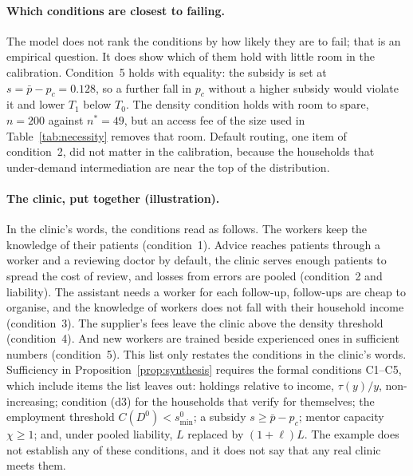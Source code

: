 \documentclass[12pt]{article}
\theoremstyle{remark}
\begin{document}
\paragraph{Which conditions are closest to failing.} The model does not rank the conditions by how likely they are to fail; that is an empirical question. It does show which of them hold with little room in the calibration. Condition~5 holds with equality: the subsidy is set at $s=\bar p-p_c=0.128$, so a further fall in $p_c$ without a higher subsidy would violate it and lower $T_1$ below $T_0$. The density condition holds with room to spare, $n=200$ against $n^*=49$, but an access fee of the size used in Table~\ref{tab:necessity} removes that room. Default routing, one item of condition~2, did not matter in the calibration, because the households that under-demand intermediation are near the top of the distribution.

\paragraph{The clinic, put together (illustration).} In the clinic's words, the conditions read as follows. The workers keep the knowledge of their patients (condition~1). Advice reaches patients through a worker and a reviewing doctor by default, the clinic serves enough patients to spread the cost of review, and losses from errors are pooled (condition~2 and liability). The assistant needs a worker for each follow-up, follow-ups are cheap to organise, and the knowledge of workers does not fall with their household income (condition~3). The supplier's fees leave the clinic above the density threshold (condition~4). And new workers are trained beside experienced ones in sufficient numbers (condition~5). This list only restates the conditions in the clinic's words. Sufficiency in Proposition~\ref{prop:synthesis} requires the formal conditions C1--C5, which include items the list leaves out: holdings relative to income, $\tau(y)/y$, non-increasing; condition (d3) for the households that verify for themselves; the employment threshold $C(D^0)<s^0_{\min}$; a subsidy $s\ge\bar p-p_c$; mentor capacity $\chi\ge1$; and, under pooled liability, $L$ replaced by $(1+\ell)L$. The example does not establish any of these conditions, and it does not say that any real clinic meets them.
\end{document}
